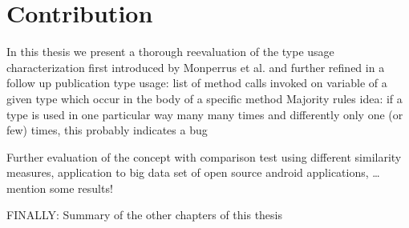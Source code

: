 \section{Contribution}

In this thesis we present a thorough reevaluation of the type usage characterization first introduced by Monperrus et al.\cite{monperrus2010detecting} and further refined in a follow up publication \cite{monperrus2013detecting}
type usage: list of method calls invoked on variable of a given type which occur in the body of a specific method
Majority rules idea: if a type is used in one particular way many many times and differently only one (or few) times, this probably indicates a bug

Further evaluation of the concept with comparison test using different similarity measures, application to big data set of open source android applications, \ldots
mention some results!

FINALLY: Summary of the other chapters of this thesis
